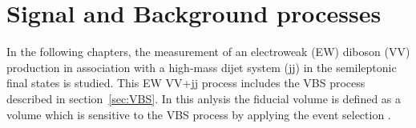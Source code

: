 \chapter{Signal and Background processes}
\label{chap:sigbkg}
In the following chapters, the measurement of an electroweak (EW) diboson (VV) production in association with a high-mass dijet system (jj) in the semileptonic final states is studied.
This EW VV+jj process includes the VBS process described in section~\ref{sec:VBS}.
In this anlysis the fiducial volume is defined as a volume which is sensitive to the VBS process by applying the event selection .
